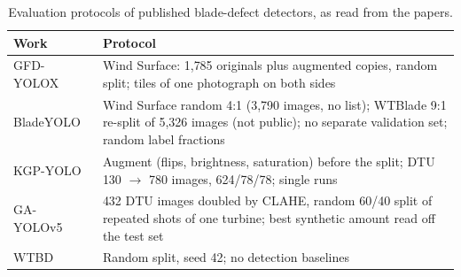 \begin{table}[!t]
\centering
\caption{Evaluation protocols of published blade-defect detectors, as read from the papers.}
\label{tab:protocols}
\footnotesize
\begin{tabularx}{\linewidth}{@{}l X@{}}
\toprule
Work & Protocol \\
\midrule
GFD-YOLOX~\cite{gfdyolox} & Wind Surface: 1{,}785 originals plus augmented copies, random split; tiles of one photograph on both sides \\
BladeYOLO~\cite{bladeyolo} & Wind Surface random 4:1 (3{,}790 images, no list); WTBlade 9:1 re-split of 5{,}326 images (not public); no separate validation set; random label fractions \\
KGP-YOLO~\cite{kgpyolo} & Augment (flips, brightness, saturation) before the split; DTU 130 $\rightarrow$ 780 images, 624/78/78; single runs \\
GA-YOLOv5~\cite{gayolo} & 432 DTU images doubled by CLAHE, random 60/40 split of repeated shots of one turbine; best synthetic amount read off the test set \\
WTBD~\cite{wtbd} & Random split, seed 42; no detection baselines \\
\bottomrule
\end{tabularx}
\end{table}
